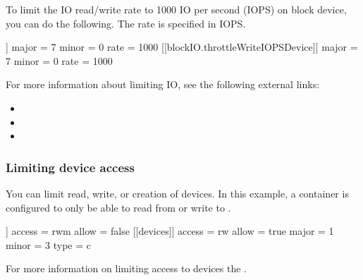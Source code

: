 \documentclass[letterpaper,10pt,english]{sphinxmanual}
\begin{document}
To limit the IO read/write rate to 1000 IO per second (IOPS) on 
block device, you can do the following. The rate is specified in IOPS.

%
\begin{sphinxVerbatim}[commandchars=\\\{\}]
[blockIO]
    [[blockIO.throttleReadIOPSDevice]]
        major = 7
        minor = 0
        rate = 1000
    [[blockIO.throttleWriteIOPSDevice]]
        major = 7
        minor = 0
        rate = 1000
\end{sphinxVerbatim}

For more information about limiting IO, see the following external links:
\begin{itemize}
\item {} 

\item {} 

\item {} 

\end{itemize}


\subsubsection{Limiting device access}
\label{\detokenize{cgroups:limiting-device-access}}
You can limit read, write, or creation of devices. In this example, a container
is configured to only be able to read from or write to .

%
\begin{sphinxVerbatim}[commandchars=\\\{\}]
[[devices]]
    access = \PYGZdq{}rwm\PYGZdq{}
    allow = false
[[devices]]
    access = \PYGZdq{}rw\PYGZdq{}
    allow = true
    major = 1
    minor = 3
    type = \PYGZdq{}c\PYGZdq{}
\end{sphinxVerbatim}

For more information on limiting access to devices the .
\end{document}
